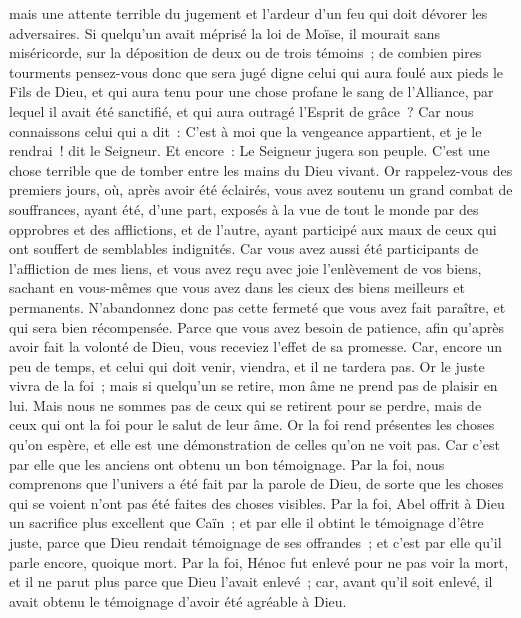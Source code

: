 \begin{multicols}{2}
mais une attente terrible du jugement et l'ardeur d'un feu qui doit dévorer les adversaires.
Si quelqu'un avait méprisé la loi de Moïse, il mourait sans miséricorde, sur la déposition de deux ou de trois témoins~;
de combien pires tourments pensez-vous donc que sera jugé digne celui qui aura foulé aux pieds le Fils de Dieu, et qui aura tenu pour une chose profane le sang de l'Alliance, par lequel il avait été sanctifié, et qui aura outragé l'Esprit de grâce~?
Car nous connaissons celui qui a dit~: C'est à moi que la vengeance appartient, et je le rendrai~! dit le Seigneur. Et encore~: Le Seigneur jugera son peuple.
C'est une chose terrible que de tomber entre les mains du Dieu vivant.
Or rappelez-vous des premiers jours, où, après avoir été éclairés, vous avez soutenu un grand combat de souffrances,
ayant été, d'une part, exposés à la vue de tout le monde par des opprobres et des afflictions, et de l'autre, ayant participé aux maux de ceux qui ont souffert de semblables indignités.
Car vous avez aussi été participants de l'affliction de mes liens, et vous avez reçu avec joie l'enlèvement de vos biens, sachant en vous-mêmes que vous avez dans les cieux des biens meilleurs et permanents.
N'abandonnez donc pas cette fermeté que vous avez fait paraître, et qui sera bien récompensée.
Parce que vous avez besoin de patience, afin qu'après avoir fait la volonté de Dieu, vous receviez l'effet de sa promesse.
Car, encore un peu de temps, et celui qui doit venir, viendra, et il ne tardera pas.
Or le juste vivra de la foi~; mais si quelqu'un se retire, mon âme ne prend pas de plaisir en lui.
Mais nous ne sommes pas de ceux qui se retirent pour se perdre, mais de ceux qui ont la foi pour le salut de leur âme.
\VerseOne{}Or la foi rend présentes les choses qu'on espère, et elle est une démonstration de celles qu'on ne voit pas.
Car c'est par elle que les anciens ont obtenu un bon témoignage.
Par la foi, nous comprenons que l'univers a été fait par la parole de Dieu, de sorte que les choses qui se voient n'ont pas été faites des choses visibles.
Par la foi, Abel offrit à Dieu un sacrifice plus excellent que Caïn~; et par elle il obtint le témoignage d'être juste, parce que Dieu rendait témoignage de ses offrandes~; et c'est par elle qu'il parle encore, quoique mort.
Par la foi, Hénoc fut enlevé pour ne pas voir la mort, et il ne parut plus parce que Dieu l'avait enlevé~; car, avant qu'il soit enlevé, il avait obtenu le témoignage d'avoir été agréable à Dieu.

\end{multicols}
